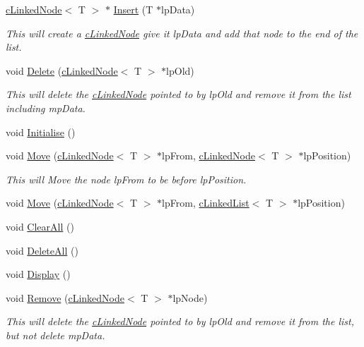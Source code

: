 \begin{DoxyCompactItemize}
\hyperlink{classc_linked_node}{cLinkedNode}$<$ T $>$ $\ast$ \hyperlink{classc_linked_list_ae9bedf047bccf0f63b10b662c809032c}{Insert} (T $\ast$lpData)
\begin{DoxyCompactList}\small\item\em This will create a \hyperlink{classc_linked_node}{cLinkedNode} give it lpData and add that node to the end of the list. \item\end{DoxyCompactList}\item 
void \hyperlink{classc_linked_list_ab4694aa48324f52b8b1c25eb43dc996c}{Delete} (\hyperlink{classc_linked_node}{cLinkedNode}$<$ T $>$ $\ast$lpOld)
\begin{DoxyCompactList}\small\item\em This will delete the \hyperlink{classc_linked_node}{cLinkedNode} pointed to by lpOld and remove it from the list including mpData. \item\end{DoxyCompactList}\item 
void \hyperlink{classc_linked_list_a1806f7d9fcba9d78f54b2787919d5407}{Initialise} ()
\item 
void \hyperlink{classc_linked_list_a4f6cff87d2c90874949757987f6b9748}{Move} (\hyperlink{classc_linked_node}{cLinkedNode}$<$ T $>$ $\ast$lpFrom, \hyperlink{classc_linked_node}{cLinkedNode}$<$ T $>$ $\ast$lpPosition)
\begin{DoxyCompactList}\small\item\em This will Move the node lpFrom to be before lpPosition. \item\end{DoxyCompactList}\item 
void \hyperlink{classc_linked_list_ad62406784a55a3477383c51a59ec7603}{Move} (\hyperlink{classc_linked_node}{cLinkedNode}$<$ T $>$ $\ast$lpFrom, \hyperlink{classc_linked_list}{cLinkedList}$<$ T $>$ $\ast$lpPosition)
\item 
void \hyperlink{classc_linked_list_a48b99bef680a675623c84684c17691a6}{ClearAll} ()
\item 
void \hyperlink{classc_linked_list_a6116806e9435ffde67f1c26f1138e431}{DeleteAll} ()
\item 
void \hyperlink{classc_linked_list_a476170cb815fe62c516fc3fb439d9c19}{Display} ()
\item 
void \hyperlink{classc_linked_list_a676cd3bd124df98773c296ed6f67ba16}{Remove} (\hyperlink{classc_linked_node}{cLinkedNode}$<$ T $>$ $\ast$lpNode)
\begin{DoxyCompactList}\small\item\em This will delete the \hyperlink{classc_linked_node}{cLinkedNode} pointed to by lpOld and remove it from the list, but not delete mpData. \item\end{DoxyCompactList}\end{DoxyCompactItemize}
